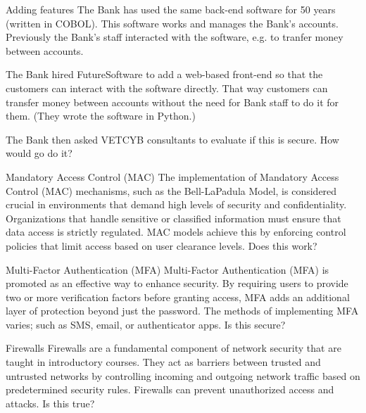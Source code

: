 \begin{frame}\begin{block}{Adding features}
The Bank has used the same back-end software for 50 years (written in COBOL). 
This software works and manages the Bank's accounts. Previously the Bank's 
staff interacted with the software, e.g. to tranfer money between accounts.

The Bank hired FutureSoftware to add a web-based front-end so that the 
customers can interact with the software directly. That way customers can 
transfer money between accounts without the need for Bank staff to do it for 
them. (They wrote the software in Python.)

The Bank then asked VETCYB consultants to evaluate if this is secure. How would 
go do it?
\end{block}\end{frame}

\begin{frame}\begin{block}{Mandatory Access Control (MAC)}
The implementation of Mandatory Access Control (MAC) mechanisms, such
as the Bell-LaPadula Model, is considered crucial in environments that
demand high levels of security and confidentiality. Organizations that
handle sensitive or classified information must ensure that data access
is strictly regulated. MAC models achieve this by enforcing control
policies that limit access based on user clearance levels. Does this work?
\end{block}\end{frame}

\begin{frame}\begin{block}{Multi-Factor Authentication (MFA)}
Multi-Factor Authentication (MFA) is promoted as an effective way to enhance 
security. By requiring users to provide two or more verification factors before 
granting access, MFA adds an additional layer of protection beyond just the 
password. The methods of implementing MFA varies; such as SMS, email, or 
authenticator apps. Is this secure?
\end{block}\end{frame}

\begin{frame}\begin{block}{Firewalls}
Firewalls are a fundamental component of network security that are
taught in introductory courses. They act as barriers between trusted and
untrusted networks by controlling incoming and outgoing network traffic
based on predetermined security rules. Firewalls can prevent
unauthorized access and attacks. Is this true?
\end{block}\end{frame}

